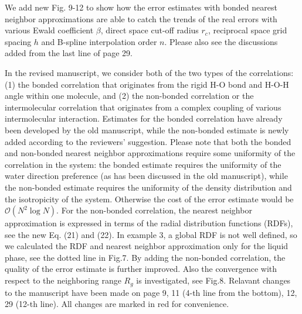 \documentclass[a4paper]{article}
\begin{document}
We add new Fig. 9-12 to show how the error estimates
with bonded nearest neighbor approximations are able to catch the
trends of the real errors with various Ewald coefficient $\beta$, direct space
cut-off radius $r_c$, reciprocal space grid spacing $h$ and B-spline
interpolation order $n$.
Please also see the discussions added
from the last line of page 29.

In the revised manuscript,
we consider both of the two types of the correlations:
(1) the bonded correlation
that originates from the rigid H-O
bond and H-O-H angle within one molecule,
and (2) the
non-bonded correlation or the
intermolecular correlation that originates from
a complex coupling of various intermolecular interaction.
Estimates for the bonded correlation
have already been developed by the old manuscript,
while the non-bonded estimate
is newly added according to the reviewers' suggestion.
Please note that
both the bonded and non-bonded nearest neighbor approximations
require some uniformity of the correlation in the system:
the bonded estimate requires the uniformity of the water
direction preference (as has been discussed in the old manuscript),
while the non-bonded estimate requires the uniformity
of the density distribution and the isotropicity of the system.
Otherwise the cost of the error estimate would be $\mathcal O(N^2\log N)$.
For the non-bonded correlation,  the nearest neighbor approximation 
is expressed in terms of the radial distribution
functions (RDFs), see the new Eq. (21) and (22). In example 3, a global RDF is not well defined,
so we calculated the RDF and nearest neighbor approximation
only for the liquid phase, see the dotted line in Fig.7. By adding
the non-bonded correlation, the quality of the error estimate
is further improved.
Also the convergence with respect to
the neighboring range $R_g$ is investigated, see Fig.8.
Relavant changes to the manuscript
have been made on page 9,
11 (4-th line from the bottom), 12, 29 (12-th line). All changes are marked 
in red for convenience.
\\
\end{document}
